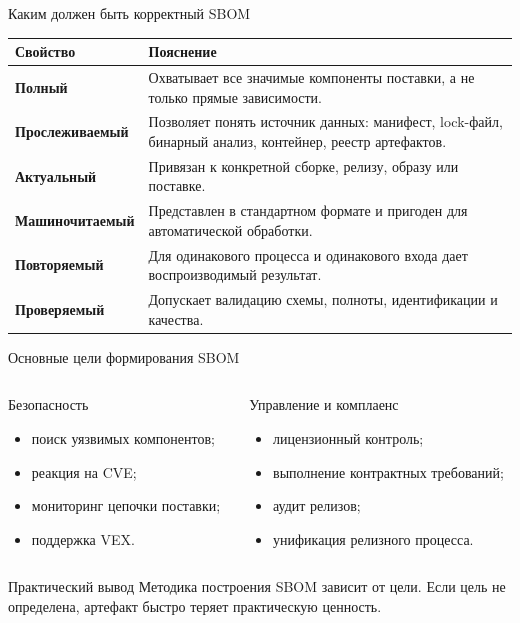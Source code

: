 \documentclass[aspectratio=169,10pt]{beamer}
\begin{document}
\begin{frame}{Каким должен быть корректный SBOM}
\begin{table}
\footnotesize
\begin{tabularx}{\textwidth}{>{\bfseries}p{2.7cm}Y}
\toprule
Свойство & Пояснение \\
\midrule
Полный & Охватывает все значимые компоненты поставки, а не только прямые зависимости. \\
Прослеживаемый & Позволяет понять источник данных: манифест, lock-файл, бинарный анализ, контейнер, реестр артефактов. \\
Актуальный & Привязан к конкретной сборке, релизу, образу или поставке. \\
Машиночитаемый & Представлен в стандартном формате и пригоден для автоматической обработки. \\
Повторяемый & Для одинакового процесса и одинакового входа дает воспроизводимый результат. \\
Проверяемый & Допускает валидацию схемы, полноты, идентификации и качества. \\
\bottomrule
\end{tabularx}
\end{table}
\end{frame}
\begin{frame}{Основные цели формирования SBOM}
\begin{columns}[T]
\begin{column}{0.5\textwidth}
\begin{block}{Безопасность}
\begin{itemize}
  \item поиск уязвимых компонентов;
  \item реакция на CVE;
  \item мониторинг цепочки поставки;
  \item поддержка VEX.
\end{itemize}
\end{block}
\end{column}
\begin{column}{0.5\textwidth}
\begin{block}{Управление и комплаенс}
\begin{itemize}
  \item лицензионный контроль;
  \item выполнение контрактных требований;
  \item аудит релизов;
  \item унификация релизного процесса.
\end{itemize}
\end{block}
\end{column}
\end{columns}

\begin{alertblock}{Практический вывод}
Методика построения SBOM зависит от цели. Если цель не определена, артефакт быстро теряет практическую ценность.
\end{alertblock}
\end{frame}
\end{document}
